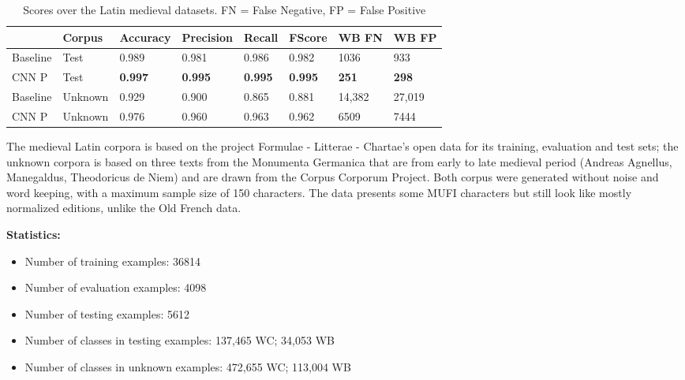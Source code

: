 \documentclass{jdmdh}
\begin{document}
\begin{table}[H]
\centering
\begin{tabular}{llllllll}
\hline
 & Corpus & Accuracy & Precision & Recall & FScore & WB FN & WB FP \\ \hline
Baseline & Test & 0.989 & 0.981 & 0.986 & 0.982 & 1036 & 933 \\
CNN P & Test & \textbf{0.997} & \textbf{0.995} & \textbf{0.995} & \textbf{0.995} & \textbf{251} & \textbf{298} \\ \hline
Baseline & Unknown & 0.929 & 0.900 & 0.865 & 0.881 & 14,382 & 27,019 \\
CNN P & Unknown & 0.976 & 0.960 & 0.963 & 0.962 & 6509 & 7444\\ \hline
\end{tabular}
\caption{Scores over the Latin medieval datasets. FN = False Negative, FP = False Positive}
\label{tab:medieval_latin_corpora}
\end{table}


The medieval Latin corpora is based on the project Formulae - Litterae - Chartae's open data \citet{formulae} for its training, evaluation and test sets; the unknown corpora is based on three texts from the Monumenta Germanica that are from early to late medieval period (Andreas Agnellus, Manegaldus, Theodoricus de Niem) and are drawn from the Corpus Corporum Project. Both corpus were generated without noise and word keeping, with a maximum sample size of 150 characters. The data presents some MUFI characters but still look like mostly normalized editions, unlike the Old French data.

\textbf{Statistics:}

\begin{itemize}
\item Number of training examples: 36814
\item Number of evaluation examples: 4098
\item Number of testing examples: 5612
\item Number of classes in testing examples: 137,465 WC; 34,053 WB
\item Number of classes in unknown examples: 472,655 WC; 113,004 WB
\end{itemize}
\end{document}
